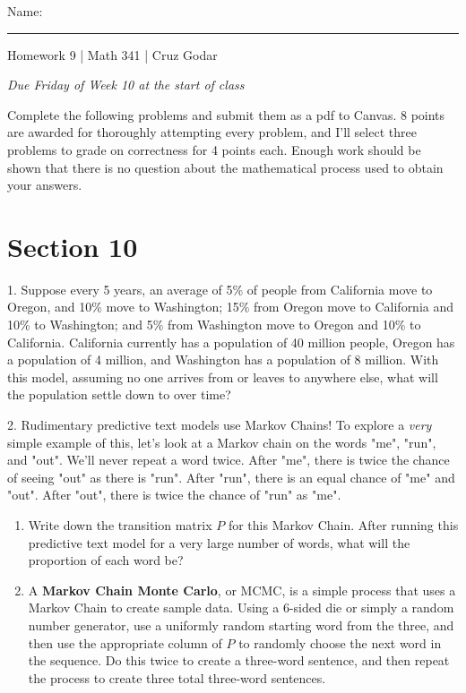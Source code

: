 \documentclass{article}
\begin{document}
\Large Name: \rule{2in}{0.15mm} \hfill Homework 9 | Math 341 | Cruz Godar \vspace{4pt} \normalsize

\textit{Due Friday of Week 10 at the start of class}

Complete the following problems and submit them as a pdf to Canvas. 8 points are awarded for thoroughly attempting every problem, and I'll select three problems to grade on correctness for 4 points each. Enough work should be shown that there is no question about the mathematical process used to obtain your answers.

\section{Section 10}

1. Suppose every 5 years, an average of 5\% of people from California move to Oregon, and 10\% move to Washington; 15\% from Oregon move to California and 10\% to Washington; and 5\% from Washington move to Oregon and 10\% to California. California currently has a population of 40 million people, Oregon has a population of 4 million, and Washington has a population of 8 million. With this model, assuming no one arrives from or leaves to anywhere else, what will the population settle down to over time?

2. Rudimentary predictive text models use Markov Chains! To explore a \textit{very} simple example of this, let's look at a Markov chain on the words "me", "run", and "out". We'll never repeat a word twice. After "me", there is twice the chance of seeing "out" as there is "run". After "run", there is an equal chance of "me" and "out". After "out", there is twice the chance of "run" as "me".

\begin{enumerate}

	\item Write down the transition matrix $P$ for this Markov Chain. After running this predictive text model for a very large number of words, what will the proportion of each word be?

	\item A \textbf{Markov Chain Monte Carlo}, or MCMC, is a simple process that uses a Markov Chain to create sample data. Using a 6-sided die or simply a random number generator, use a uniformly random starting word from the three, and then use the appropriate column of $P$ to randomly choose the next word in the sequence. Do this twice to create a three-word sentence, and then repeat the process to create three total three-word sentences.

\end{enumerate}
\end{document}
